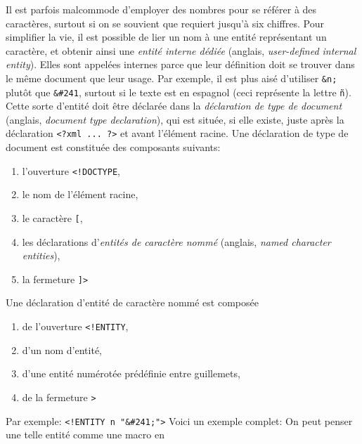 Il est parfois malcommode d'employer des nombres pour se référer à des
caractères, surtout si on se souvient que \Unicode requiert jusqu'à
six chiffres. Pour simplifier la vie, il est possible de lier un nom à
une entité représentant un caractère, et obtenir ainsi une
\emph{entité interne dédiée} (anglais, \emph{user-defined internal
  entity}). Elles sont appelées internes parce que leur définition
doit se trouver dans le même document que leur usage. Par exemple, il
est plus aisé d'utiliser \verb|&n;| plutôt que \verb|&#241|, surtout
si le texte est en espagnol (ceci représente la lettre
\texttt{\~{n}}). Cette sorte d'entité doit être déclarée dans la
\emph{déclaration de type de document} (anglais, \emph{document type
  declaration}), qui est située, si elle existe, juste après la
déclaration \verb|<?xml ... ?>| et avant l'élément racine.
\label{xml_intro_DOCTYPE} Une déclaration de type de document est
constituée des composants suivants:
\begin{enumerate}

  \item l'ouverture \verb|<!DOCTYPE|,

  \item le nom de l'élément racine,

  \item le caractère \verb|[|,

  \item les déclarations d'\emph{entités de caractère nommé} (anglais,
    \emph{named character entities}),

  \item la fermeture \verb|]>|

\end{enumerate}
Une déclaration d'entité de caractère nommé est composée
\begin{enumerate}

  \item de l'ouverture \verb|<!ENTITY|,

  \item d'un nom d'entité,

  \item d'une entité numérotée prédéfinie entre guillemets,

  \item de la fermeture \verb|>|

\end{enumerate}
Par exemple: {\small\verb|<!ENTITY n "&#241;">|}
Voici un exemple complet:
\noindent On peut penser une telle entité comme une macro en
